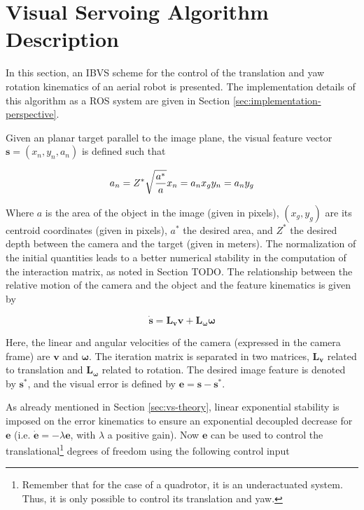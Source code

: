 \section{Visual Servoing Algorithm Description}
\label{sec:vs-algorithm-description}

In this section, an IBVS scheme for the control of the translation and yaw rotation kinematics \cite{bourquardez_2009} of an aerial robot is presented. The implementation details of this algorithm as a ROS system are given in Section \ref{sec:implementation-perspective}. 

Given an planar target parallel to the image plane, the visual feature vector $\bm{s} = (x_n, y_n, a_n)$ is defined such that

\begin{equation*}
a_n = Z^\ast \sqrt{\frac{a^\ast}{a}} \\
x_n = a_n x_g \\
 y_n = a_n y_g 
\end{equation*}

Where $a$ is the area of the object in the image (given in pixels), $\left( x_g , y_g \right) $ are its centroid coordinates (given in pixels), $a^\ast$ the desired area, and $Z^\ast$ the desired depth between the camera and the target (given in meters). The normalization of the initial quantities leads to a better numerical stability in the computation of the interaction matrix, as noted in Section TODO. The relationship between the relative motion of the camera and the object and the feature kinematics is given by

\begin{equation}
\dot{\bm{s}} = \bm{L_v} \bm{v} + \bm{L_\omega} \bm{\omega}
\end{equation}

Here, the linear and angular velocities of the camera (expressed in the camera frame) are $\bm{v}$ and $\bm{\omega}$. The iteration matrix is separated in two matrices, $\bm{L_v}$ related to translation and $\bm{L_\omega}$ related to rotation. The desired image feature is denoted by $\bm{s}^\ast$, and the visual error is defined by $\bm{e} = \bm{s} - \bm{s}^\ast$.

As already mentioned in Section \ref{sec:vs-theory}, linear exponential stability is imposed on the error kinematics to ensure an exponential decoupled decrease for $\bm{e}$ (i.e. $\dot{\bm{e}} = - \lambda \bm{e}$, with $\lambda$ a positive gain). Now $\bm{e}$ can be used to control the translational\footnote{Remember that for the case of a quadrotor, it is an underactuated system. Thus, it is only possible to control its translation and yaw.} degrees of freedom using the following control input

